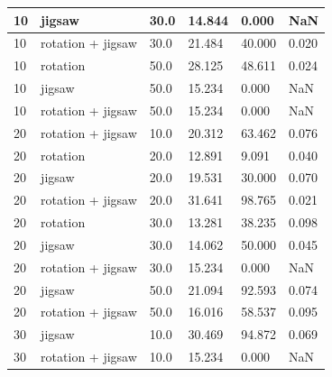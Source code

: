 \begin{longtable}{|| p{} | p{} | p{} | p{} | p{} | p{} ||}
    10                & jigsaw            & 30.0           & 14.844                    & 0.000                  & NaN     \\ \hline
    10                & rotation + jigsaw & 30.0           & 21.484                    & 40.000                 & 0.020   \\ \hline
    10                & rotation          & 50.0           & 28.125                    & 48.611                 & 0.024   \\ \hline
    10                & jigsaw            & 50.0           & 15.234                    & 0.000                  & NaN     \\ \hline
    10                & rotation + jigsaw & 50.0           & 15.234                    & 0.000                  & NaN     \\ \hline
    20                & rotation + jigsaw & 10.0           & 20.312                    & 63.462                 & 0.076   \\ \hline
    20                & rotation          & 20.0           & 12.891                    & 9.091                  & 0.040   \\ \hline
    20                & jigsaw            & 20.0           & 19.531                    & 30.000                 & 0.070   \\ \hline
    20                & rotation + jigsaw & 20.0           & 31.641                    & 98.765                 & 0.021   \\ \hline
    20                & rotation          & 30.0           & 13.281                    & 38.235                 & 0.098   \\ \hline
    20                & jigsaw            & 30.0           & 14.062                    & 50.000                 & 0.045   \\ \hline
    20                & rotation + jigsaw & 30.0           & 15.234                    & 0.000                  & NaN     \\ \hline
    20                & jigsaw            & 50.0           & 21.094                    & 92.593                 & 0.074   \\ \hline
    20                & rotation + jigsaw & 50.0           & 16.016                    & 58.537                 & 0.095   \\ \hline
    30                & jigsaw            & 10.0           & 30.469                    & 94.872                 & 0.069   \\ \hline
    30                & rotation + jigsaw & 10.0           & 15.234                    & 0.000                  & NaN     \\ \hline

\end{longtable}
